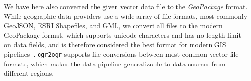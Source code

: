 
We have here also converted the given vector data file to the \textit{GeoPackage} format.
While geographic data providers use a wide array of file formats, most commonly GeoJSON, ESRI Shapefiles, and GML, we convert all files to the modern GeoPackage format, which supports unicode characters and has no length limit on data fields, and is therefore considered the best format for modern GIS pipelines~\cite{hame_shapefile_2019}.
\texttt{ogr2ogr} supports file conversions between most common vector file formats, which makes the data pipeline generalizable to data sources from different regions.

